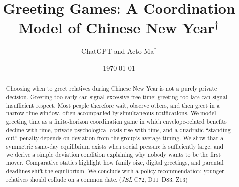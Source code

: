 \documentclass[AER]{AEA}
\begin{document}
\title{Greeting Games: A Coordination Model of Chinese New Year$^\dagger$}

\author{ChatGPT and Acto Ma$^*$}
\date{\today}

\begin{abstract}
Choosing when to greet relatives during Chinese New Year is not a purely private decision. Greeting too early can signal excessive free time; greeting too late can signal insufficient respect. Most people therefore wait, observe others, and then greet in a narrow time window, often accompanied by simultaneous notifications. We model greeting time as a finite-horizon coordination game in which envelope-related benefits decline with time, private psychological costs rise with time, and a quadratic ``standing out'' penalty depends on deviation from the group's average timing. We show that a symmetric same-day equilibrium exists when social pressure is sufficiently large, and we derive a simple deviation condition explaining why nobody wants to be the first mover. Comparative statics highlight how family size, digital greetings, and parental deadlines shift the equilibrium. We conclude with a policy recommendation: younger relatives should collude on a common date.
\noindent (\textit{JEL} C72, D11, D83, Z13) \\
\end{abstract}

\maketitle

\let\thefootnote\relax{}
\let\thefootnote\relax{}

\def\thefootnote{\arabic{footnote}}
\setcounter{footnote}{0}
\end{document}
